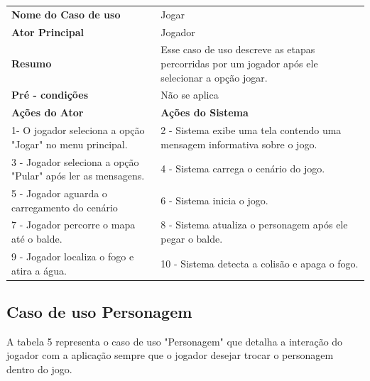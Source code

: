 \begin{table} [h!]
\centering 
{} 
\begin{tabular}{ | m{5cm} | m{8cm}| }  
\hline 
\textbf {Nome do Caso de uso} & Jogar \\ 
\textbf {Ator Principal} & Jogador \\  
\textbf {Resumo} & Esse caso de uso descreve as etapas percorridas por um jogador após ele selecionar a opção jogar. \\ 
\textbf {Pré - condições} & Não se aplica\\ 
\hline 
\textbf {Ações do Ator} & \textbf {Ações do Sistema}\\ 
\hline 
1- O jogador seleciona a opção "Jogar" no menu principal. & 2 - Sistema exibe uma tela contendo uma mensagem informativa sobre o jogo.\\ 
3 - Jogador seleciona a opção "Pular" após ler as mensagens. & 4 - Sistema carrega o cenário do jogo.\\
5 - Jogador aguarda o carregamento do cenário & 6 - Sistema inicia o jogo.\\
7 - Jogador percorre o mapa até o balde. & 8 - Sistema atualiza o personagem após ele pegar o balde.\\
9 - Jogador localiza o fogo e atira a água. & 10 - Sistema detecta a colisão e apaga o fogo.\\
\hline 
\end{tabular} 
\end{table}

\subsection{Caso de uso Personagem} 
A tabela 5 representa o caso de uso "Personagem" que detalha a interação do jogador com a aplicação sempre que o jogador desejar trocar o personagem dentro do jogo.

